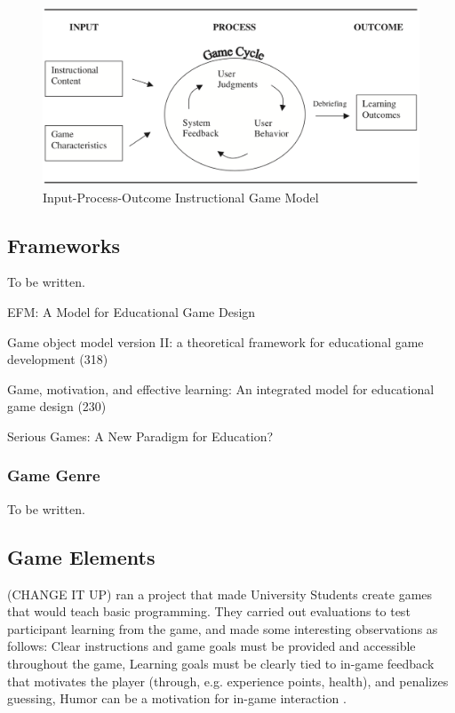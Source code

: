 \documentclass[a4paper,11.5pt]{report}
\numberwithin{figure}{section}
\numberwithin{table}{section}
\numberwithin{equation}{section}
\numberwithin{equation}{section}
\begin{document}
\begin{figure}[H]
 \centering
    \includegraphics[width=1\textwidth]{Inputprocessoutcomegamemodel}
       \captionsetup{justification=centering}
\caption{Input-Process-Outcome Instructional Game Model  {\citep{Driskell2002}}}
\label{fig:Input_process_outcome_game_model}
\end{figure}

\subsection{Frameworks}

To be written.

EFM: A Model for Educational Game Design

Game object model version II: a theoretical framework for educational game development (318)

Game, motivation, and effective learning: An integrated model for educational game design (230)

Serious Games: A New Paradigm for Education?

\subsubsection{Game Genre}

To be written.

\subsection{Game Elements}

(CHANGE IT UP) \citeauthor{Barnes2007} ran a project that made University Students create games that would teach basic programming. They carried out evaluations to test participant learning from the game, and made some interesting observations as follows: Clear instructions and game goals must be provided and accessible throughout the game, Learning goals must be clearly tied to in-game feedback that motivates the player (through, e.g. experience points, health), and penalizes guessing, Humor can be a motivation for in-game interaction \citep{Barnes2007}.
\end{document}
